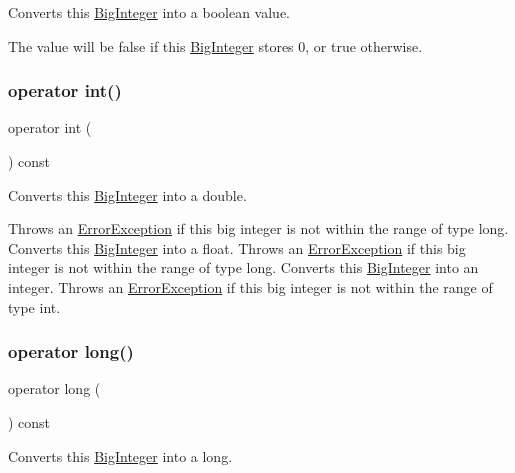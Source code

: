 Converts this \mbox{\hyperlink{classBigInteger}{Big\+Integer}} into a boolean value. 

The value will be false if this \mbox{\hyperlink{classBigInteger}{Big\+Integer}} stores 0, or true otherwise. \mbox{\label{classBigInteger_a48d27bd92e68c69527589ea65a9af69f}} 
\subsubsection{\texorpdfstring{operator int()}{operator int()}}
{\footnotesize\ttfamily operator int (\begin{DoxyParamCaption}{ }\end{DoxyParamCaption}) const\hspace{0.3cm}{\ttfamily [explicit]}}



Converts this \mbox{\hyperlink{classBigInteger}{Big\+Integer}} into a double. 

Throws an \mbox{\hyperlink{classErrorException}{Error\+Exception}} if this big integer is not within the range of type long. Converts this \mbox{\hyperlink{classBigInteger}{Big\+Integer}} into a float. Throws an \mbox{\hyperlink{classErrorException}{Error\+Exception}} if this big integer is not within the range of type long. Converts this \mbox{\hyperlink{classBigInteger}{Big\+Integer}} into an integer. Throws an \mbox{\hyperlink{classErrorException}{Error\+Exception}} if this big integer is not within the range of type int. \mbox{\label{classBigInteger_ad7ce59321a0dd63e7f1fab6dceabe53b}} 
\subsubsection{\texorpdfstring{operator long()}{operator long()}}
{\footnotesize\ttfamily operator long (\begin{DoxyParamCaption}{ }\end{DoxyParamCaption}) const\hspace{0.3cm}{\ttfamily [explicit]}}



Converts this \mbox{\hyperlink{classBigInteger}{Big\+Integer}} into a long. 

